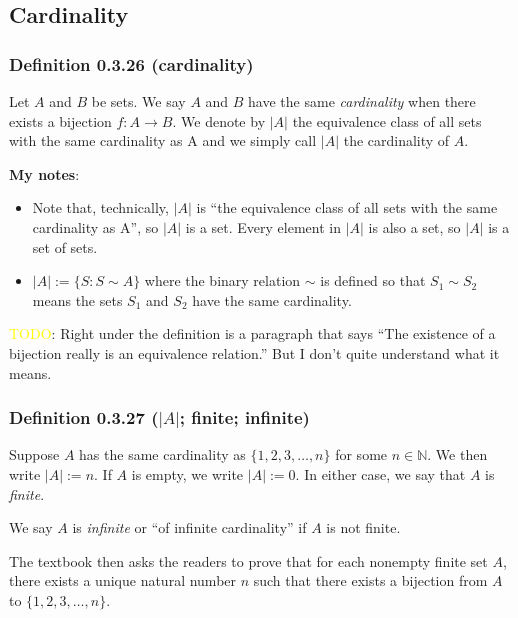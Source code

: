 \documentclass[12pt, letterpaper, oneside]{book}
\begin{document}
\subsection{Cardinality}

\subsubsection{Definition 0.3.26 (cardinality)}

Let $A$ and $B$ be sets. We say $A$ and $B$ have the same \textit{cardinality}
when there exists a bijection $f: A \rightarrow B$. We denote by $|A|$ the
equivalence class of all sets with the same cardinality as A and we simply call
$|A|$ the cardinality of $A$.

\colorbox{lime!100}{\textbf{My notes}}:
\begin{itemize}
  \item Note that, technically, $|A|$ is ``the equivalence class of all sets
        with the same cardinality as A'', so $|A|$ is a set. Every element in $|A|$
        is also a set, so $|A|$ is a set of sets.
  \item $|A|:= \{S: S \sim A\}$ where the binary relation $\sim$ is defined so
        that $S_1 \sim S_2$ means the sets $S_1$ and $S_2$ have the same
        cardinality.
\end{itemize}

\colorbox{red!100}{\textcolor{yellow}{TODO}}: Right under the definition is a
paragraph that says ``The existence of a bijection really is an equivalence
relation.'' But I don't quite understand what it means.

\subsubsection{Definition 0.3.27 ($|A|$; finite; infinite)}

Suppose $A$ has the same cardinality as $\{1, 2, 3, \ldots , n\}$ for some $n
  \in \mathbb{N}$. We then write $|A|:= n$. If $A$ is empty, we write $|A|:= 0$.
In either case, we say that $A$ is \textit{finite}.

We say $A$ is \textit{infinite} or ``of infinite cardinality'' if $A$ is not
finite.

The textbook then asks the readers to prove that for each nonempty finite set
$A$, there exists a unique natural number $n$ such that there exists a bijection
from $A$ to $\{1, 2, 3, \ldots, n\}$.
\end{document}
